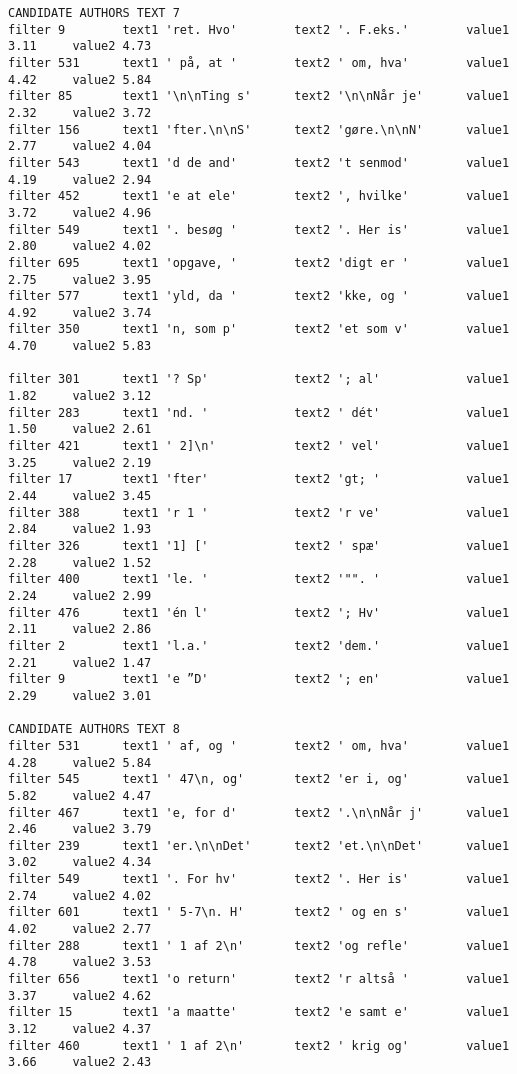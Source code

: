 {\begin{verbatim}
CANDIDATE AUTHORS TEXT 7
filter 9        text1 'ret. Hvo'        text2 '. F.eks.'        value1 3.11     value2 4.73
filter 531      text1 ' på, at '        text2 ' om, hva'        value1 4.42     value2 5.84
filter 85       text1 '\n\nTing s'      text2 '\n\nNår je'      value1 2.32     value2 3.72
filter 156      text1 'fter.\n\nS'      text2 'gøre.\n\nN'      value1 2.77     value2 4.04
filter 543      text1 'd de and'        text2 't senmod'        value1 4.19     value2 2.94
filter 452      text1 'e at ele'        text2 ', hvilke'        value1 3.72     value2 4.96
filter 549      text1 '. besøg '        text2 '. Her is'        value1 2.80     value2 4.02
filter 695      text1 'opgave, '        text2 'digt er '        value1 2.75     value2 3.95
filter 577      text1 'yld, da '        text2 'kke, og '        value1 4.92     value2 3.74
filter 350      text1 'n, som p'        text2 'et som v'        value1 4.70     value2 5.83

filter 301      text1 '? Sp'            text2 '; al'            value1 1.82     value2 3.12
filter 283      text1 'nd. '            text2 ' dét'            value1 1.50     value2 2.61
filter 421      text1 ' 2]\n'           text2 ' vel'            value1 3.25     value2 2.19
filter 17       text1 'fter'            text2 'gt; '            value1 2.44     value2 3.45
filter 388      text1 'r 1 '            text2 'r ve'            value1 2.84     value2 1.93
filter 326      text1 '1] ['            text2 ' spæ'            value1 2.28     value2 1.52
filter 400      text1 'le. '            text2 '"". '            value1 2.24     value2 2.99
filter 476      text1 'én l'            text2 '; Hv'            value1 2.11     value2 2.86
filter 2        text1 'l.a.'            text2 'dem.'            value1 2.21     value2 1.47
filter 9        text1 'e ”D'            text2 '; en'            value1 2.29     value2 3.01

CANDIDATE AUTHORS TEXT 8
filter 531      text1 ' af, og '        text2 ' om, hva'        value1 4.28     value2 5.84
filter 545      text1 ' 47\n, og'       text2 'er i, og'        value1 5.82     value2 4.47
filter 467      text1 'e, for d'        text2 '.\n\nNår j'      value1 2.46     value2 3.79
filter 239      text1 'er.\n\nDet'      text2 'et.\n\nDet'      value1 3.02     value2 4.34
filter 549      text1 '. For hv'        text2 '. Her is'        value1 2.74     value2 4.02
filter 601      text1 ' 5-7\n. H'       text2 ' og en s'        value1 4.02     value2 2.77
filter 288      text1 ' 1 af 2\n'       text2 'og refle'        value1 4.78     value2 3.53
filter 656      text1 'o return'        text2 'r altså '        value1 3.37     value2 4.62
filter 15       text1 'a maatte'        text2 'e samt e'        value1 3.12     value2 4.37
filter 460      text1 ' 1 af 2\n'       text2 ' krig og'        value1 3.66     value2 2.43


\end{verbatim}}
